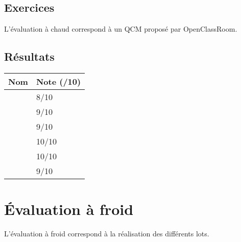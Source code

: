 \documentclass[asi, sansVersion]{picInsa}
\begin{document}
		\subsection*{Exercices}
		L'évaluation à chaud correspond à un QCM proposé par OpenClassRoom.

			
		\subsection*{Résultats}
			\begin{longtable}{|p{0.5\textwidth}|p{}|}
				\hline
					\rowcolor[gray]{0.90} Nom & Note (/10) \\
				\hline
					\Mathieu &  8/10\\
				\hline
					\Julie &  9/10\\
				\hline
					\Melissa &  9/10\\
				\hline
					\Michel &  10/10\\
				\hline
					\Matthieu &  10/10\\
				\hline
					\Kafui &  9/10\\
					
				\hline
			
			\end{longtable}
			
	\newpage
	\section*{Évaluation à froid}
		L'évaluation à froid correspond à la réalisation des différents lots.
\end{document}
